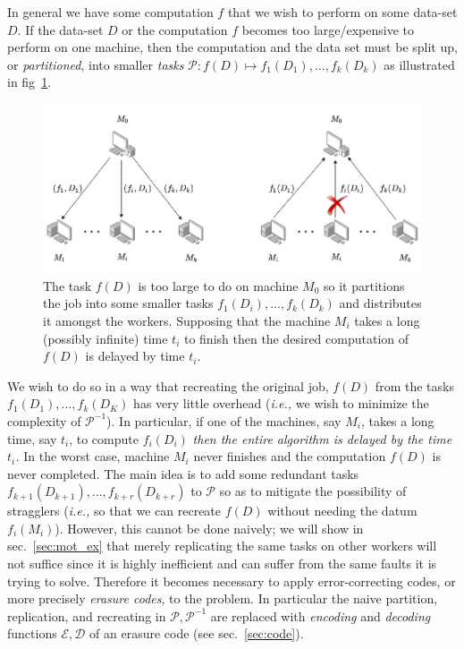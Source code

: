 \documentclass{report}
\begin{document}
In general we have some computation $f$ that we wish to perform on some data-set $D$. If the data-set $D$ or the computation $f$ becomes too large/expensive to perform on one machine, then the computation and the data set must be split up, or \emph{partitioned}, into smaller \emph{tasks} $\mathcal{P} : f(D) \mapsto f_1(D_1) ,..., f_k(D_k)$ as illustrated in fig~\ref{fig:1}. 
\begin{figure}
    \centering
    \includegraphics[width=\textwidth]{straggler_diag_1.jpg}
    \caption{The task $f(D)$ is too large to do on machine $M_0$ so it partitions the job into some smaller tasks $f_1(D_i), ..., f_k(D_k)$ and distributes it amongst the workers. Supposing that the machine $M_i$ takes a long (possibly infinite) time $t_i$ to finish then the desired computation of $f(D)$ is delayed by time $t_i$.}
    \label{fig:1}
\end{figure}
We wish to do so in a way that recreating the original job, $f(D)$ from the tasks $f_1(D_1) , ..., f_k(D_K)$ has very little overhead (\emph{i.e.,} we wish to minimize the complexity of $\mathcal{P}^{-1}$). 
In particular, if one of the machines, say $M_i$, takes a long time, say $t_i$, to compute $f_i(D_i)$ \textit{then the entire algorithm is delayed by the time $t_i$.} In the worst case, machine $M_i$ never finishes and the computation $f(D)$ is never completed. 
The main idea is to add some redundant tasks $f_{k+1}(D_{k+1}),...,f_{k+r}(D_{k+r})$ to $\mathcal{P}$ so as to mitigate the possibility of stragglers (\emph{i.e.,} so that we can recreate $f(D)$ without needing the datum $f_i(M_i)$).
However, this cannot be done naively; we will show in sec.~\ref{sec:mot_ex} that merely replicating the same tasks on other workers will not suffice since it is highly inefficient and can suffer from the same faults it is trying to solve. Therefore it becomes necessary to apply error-correcting codes, or more precisely \textit{erasure codes}, to the problem. In particular the naive partition, replication, and recreating in $\mathcal{P},\mathcal{P}^{-1}$ are replaced with \emph{encoding} and \emph{decoding} functions $\mathcal{E},\mathcal{D}$ of an erasure code (see sec.~\ref{sec:code}). 
\end{document}
